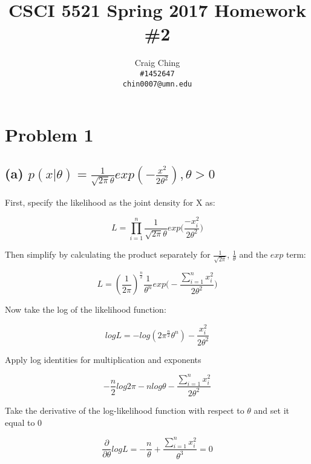 \documentclass{article}
\author{Craig Ching\\
      \texttt{\#1452647} \\
      \texttt{chin0007@umn.edu}}
\title{
CSCI 5521 Spring 2017 Homework \#2}
\begin{document}
\maketitle

\section{Problem 1}

\subsection{(a) $p(x|\theta) = \frac{1}{\sqrt{2\pi}\theta} exp(-\frac{x^2}{2\theta^2}), \theta > 0$}

First, specify the likelihood as the joint density for X as:

\begin{equation}
L = \prod\limits_{i = 1}^{n} \frac{1}{ \sqrt{2\pi} \theta } exp \Big( \frac{-x_i^2}{2 \theta^2} \Big)
\end{equation}

\noindent Then simplify by calculating the product separately for $\frac{1}{\sqrt{2\pi}}$, $\frac{1}{\theta}$ and the $exp$ term:

\begin{equation}
L = ( \frac{1}{ 2\pi} )^{\frac{n}{2}} \frac{1}{\theta^n}  exp \Bigg( - \frac{\sum\limits_{i = 1}^{n} x_i^2}{ 2\theta^2} \Bigg)
\end{equation}

\noindent Now take the log of the likelihood function:

\begin{equation}
log L = - log ( 2\pi ^{\frac{n}{2}} \theta^n ) - \frac{x_i^2}{2\theta^2}
\end{equation}

\noindent Apply log identities for multiplication and exponents

\begin{equation}
- \frac{n}{2} log 2\pi - n log \theta - \frac{\sum\limits_{i = 1}^n x_i^2}{2\theta^2}
\end{equation}

\noindent Take  the derivative of the log-likelihood function with respect to $\theta$ and set it equal to $0$

\begin{equation}
\frac{\partial}{\partial \theta} log L = - \frac{n}{\theta} + \frac{ \sum\limits_{i = 1}^{n} x_i^2}{\theta^3} = 0
\end{equation}
\end{document}
